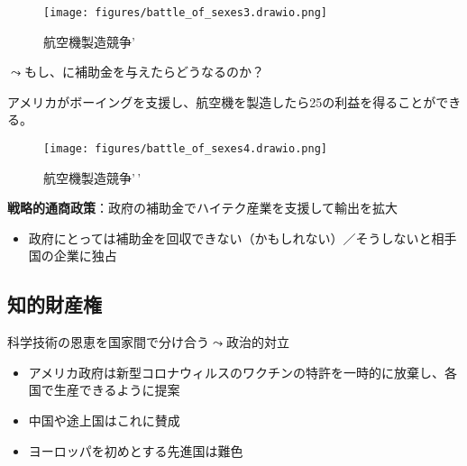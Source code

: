 \documentclass[
  xelatex,
  ja=standard]{bxjsarticle}
\providecommand{\tightlist}{%
  \setlength{\itemsep}{0pt}\setlength{\parskip}{0pt}}\usepackage{longtable,booktabs,array}
\begin{document}
\begin{figure}[htpb]

{\centering \texttt{[image: figures/battle\_of\_sexes3.drawio.png]}

}

\caption{航空機製造競争'}

\end{figure}

\(\leadsto\)もし、に補助金を与えたらどうなるのか？

\begin{tcolorbox}[enhanced jigsaw, coltitle=black, breakable, opacitybacktitle=0.6, left=2mm, titlerule=0mm, arc=.35mm, colbacktitle=quarto-callout-tip-color!10!white, opacityback=0, leftrule=.75mm, title=\textcolor{quarto-callout-tip-color}{\faLightbulb}\hspace{0.5em}{航空機製造競争'\,'}, toptitle=1mm, bottomrule=.15mm, colframe=quarto-callout-tip-color-frame, toprule=.15mm, colback=white, rightrule=.15mm, bottomtitle=1mm]

アメリカがボーイングを支援し、航空機を製造したら25の利益を得ることができる。

\end{tcolorbox}

\begin{figure}[htpb]

{\centering \texttt{[image: figures/battle\_of\_sexes4.drawio.png]}

}

\caption{航空機製造競争'\,'}

\end{figure}

\textbf{戦略的通商政策}：政府の補助金でハイテク産業を支援して輸出を拡大

\begin{itemize}
\tightlist
\item
  政府にとっては補助金を回収できない（かもしれない）／そうしないと相手国の企業に独占
\end{itemize}

\hypertarget{ux77e5ux7684ux8ca1ux7523ux6a29}{%
\subsection{知的財産権}\label{ux77e5ux7684ux8ca1ux7523ux6a29}}

科学技術の恩恵を国家間で分け合う\(\leadsto\)政治的対立

\begin{itemize}
\tightlist
\item
  アメリカ政府は新型コロナウィルスのワクチンの特許を一時的に放棄し、各国で生産できるように提案
\item
  中国や途上国はこれに賛成
\item
  ヨーロッパを初めとする先進国は難色
\end{itemize}
\end{document}
